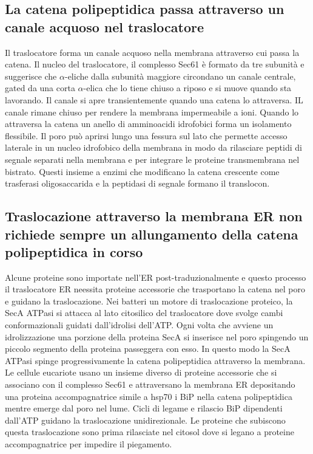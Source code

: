 \subsection{La catena polipeptidica passa attraverso un canale acquoso nel traslocatore}
Il traslocatore forma un canale acquoso nella membrana attraverso cui passa la catena. Il nucleo del traslocatore, il complesso Sec61 \`e formato da tre subunit\`a e suggerisce che 
$\alpha$-eliche dalla subunit\`a maggiore circondano un canale centrale, gated da una corta $\alpha$-elica che lo tiene chiuso a riposo e si muove quando sta lavorando. Il canale si
apre transientemente quando una catena lo attraversa. IL canale rimane chiuso per rendere la membrana impermeabile a ioni. Quando lo attraversa la catena un anello di amminoacidi 
idrofobici forma un isolamento flessibile. Il poro pu\`o aprirsi lungo una fessura sul lato che permette accesso laterale in un nucleo idrofobico della membrana in modo 
da rilasciare peptidi di segnale separati nella membrana e per integrare le proteine transmembrana nel bistrato. Questi insieme a enzimi che modificano la catena crescente come
trasferasi oligosaccarida e la peptidasi di segnale formano il translocon.
\subsection{Traslocazione attraverso la membrana ER non richiede sempre un allungamento della catena polipeptidica in corso}
Alcune proteine sono importate nell'ER post-traduzionalmente e questo processo il traslocatore ER neessita proteine accessorie che trasportano la catena nel poro e guidano la 
traslocazione. Nei batteri un motore di traslocazione proteico, la SecA ATPasi si attacca al lato citosilico del traslocatore dove svolge cambi conformazionali guidati dall'idrolisi 
dell'ATP. Ogni volta che avviene un idrolizzazione una porzione della proteina SecA si inserisce nel poro spingendo un piccolo segmento della proteina passeggera con esso. In questo 
modo la SecA ATPasi spinge progressivamente la catena polipeptidica attraverso la membrana. Le cellule eucariote usano un insieme diverso di proteine accessorie che si associano con il
complesso Sec61 e attraversano la membrana ER depositando una proteina accompagnatrice simile a hsp70 i BiP nella catena polipeptidica mentre emerge dal poro nel lume. Cicli di legame
e rilascio BiP dipendenti dall'ATP guidano la traslocazione unidirezionale. Le proteine che subiscono questa traslocazione sono prima rilasciate nel citosol dove si legano a 
proteine accompagnatrice per impedire il piegamento. 
